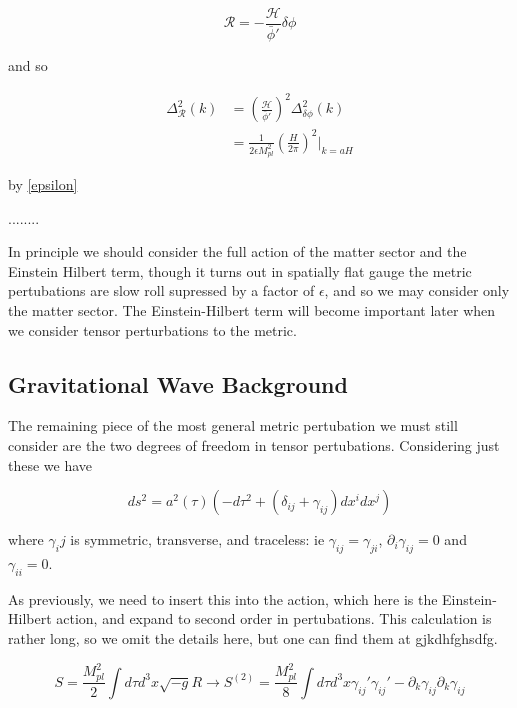 \documentclass[a4paper,11pt]{article}
\newcommand{\Mp}{M_{pl}}
\newcommand{\bphi}{\bar{\phi}}
\begin{document}
\begin{equation}
\mathcal{R} = -\frac{\mathcal{H}}{\bphi'}\delta\phi
\end{equation}

and so 

\begin{align}
\Delta^2_{\mathcal{R}}(k) &=(\frac{\mathcal{H}}{\bphi'})^2\Delta^2_{\delta\phi}(k)\\
&=\frac{1}{2\epsilon\Mp^2}(\frac{H}{2\pi})^2\rvert_{k=aH}
\end{align}

by \ref{epsilon}


........



 In principle we should consider the full action of the matter sector and the Einstein Hilbert term, though it turns out in spatially flat gauge the metric pertubations are slow roll supressed by a factor of $\epsilon$, and so we may consider only the matter sector. The Einstein-Hilbert term will become important later when we consider tensor perturbations to the metric.\\




\subsection{Gravitational Wave Background}

The remaining piece of the most general metric pertubation we must still consider are the two degrees of freedom in tensor pertubations. Considering just these we have

\begin{equation}
ds^2 = a^2(\tau)(-d\tau^2 + (\delta_{ij}+\gamma_{ij})dx^idx^j)
\end{equation}

where $\gamma_ij$ is symmetric, transverse, and traceless: ie $\gamma_{ij}=\gamma_{ji}$, $\partial_i\gamma_{ij}=0$ and $\gamma_{ii}=0$.

As previously, we need to insert this into the action, which here is the Einstein-Hilbert action, and expand to second order in pertubations. This calculation is rather long, so we omit the details here, but one can find them at gjkdhfghsdfg. 

\begin{equation}
S=\frac{\Mp^2}{2} \int d\tau d^3x \sqrt{-g}R \rightarrow S^{(2)} = \frac{\Mp^2}{8}\int d\tau d^3x \gamma_{ij}'\gamma_{ij}'-\partial_k\gamma_{ij}\partial_k\gamma_{ij}
\end{equation}
\end{document}
